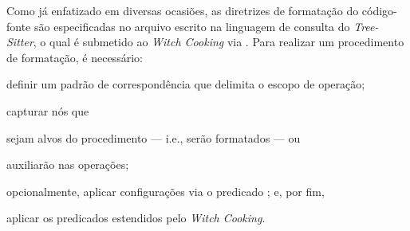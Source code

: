 \documentclass
  [11pt,a4paper,english,brazil,openright,sumario=tradicional,twoside]
  {abntex2}
\newcommand{\treesitter}{\textit{Tree-Sitter}\xspace}
\newcommand{\witchcooking}{\textit{Witch Cooking}\xspace}
\begin{document}
  Como já enfatizado em diversas ocasiões, as diretrizes de formatação do
  código-fonte são especificadas no arquivo escrito na linguagem de consulta do
  \treesitter, o qual é submetido ao \witchcooking via
  . Para realizar um procedimento de formatação, é
  necessário:
  \begin{inparaenum}
    \item definir um padrão de correspondência que delimita o escopo de
          operação;
    \item capturar nós que
          \begin{inparaenum}
            \item sejam alvos do procedimento --- i.e., serão formatados --- ou
            \item auxiliarão nas operações;
          \end{inparaenum}
    \item opcionalmente, aplicar configurações via o predicado
          ; e, por fim,
    \item aplicar os predicados estendidos pelo \witchcooking.
  \end{inparaenum}
\end{document}
